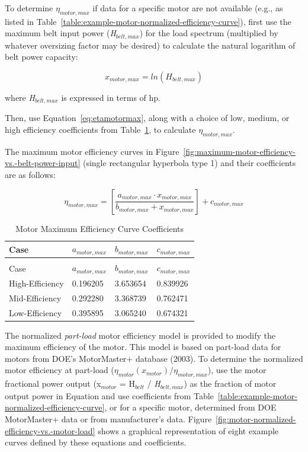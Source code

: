 {{{To determine \(\eta_{motor,max}\) if data for a specific motor are not available (e.g., as listed in Table~\ref{table:example-motor-normalized-efficiency-curve}), first use the maximum belt input power (\emph{H\(_{belt,max}\)}) for the load spectrum (multiplied by whatever oversizing factor may be desired) to calculate the natural logarithm of belt power capacity:

\begin{equation}
x_{motor,max} = ln({H_{belt,max}})
\end{equation}

where \emph{H\(_{belt,max}\)} is expressed in terms of hp.

Then, use Equation~\ref{eq:etamotormax}, along with a choice of low, medium, or high efficiency coefficients from Table~\ref{table:motor-maximum-efficiency-curve-coefficients}, to calculate \(\eta_{motor,max}\).

The maximum motor efficiency curves in Figure~\ref{fig:maximum-motor-efficiency-vs.-belt-power-input} (single rectangular hyperbola type 1) and their coefficients are as follows:

\begin{equation}
{\eta_{motor,max}} = \left[ {\frac{{{a_{motor,max}} \cdot {x_{motor,max}}}}{{{b_{motor,max}} + {x_{motor,max}}}}} \right] + {c_{motor,max}}
\label{eq:etamotormax}
\end{equation}

\begin{longtable}[c]{@{}llll@{}}
\caption{Motor Maximum Efficiency Curve Coefficients \label{table:motor-maximum-efficiency-curve-coefficients}} \tabularnewline
\toprule 
Case & \(a_{motor,max}\) & \(b_{motor,max}\) & \(c_{motor,max}\) \tabularnewline
\midrule
\endfirsthead

\caption[]{Motor Maximum Efficiency Curve Coefficients} \tabularnewline
\toprule 
Case & \(a_{motor,max}\) & \(b_{motor,max}\) & \(c_{motor,max}\) \tabularnewline
\midrule
\endhead

High-Efficiency & 0.196205 & 3.653654 & 0.839926 \tabularnewline
Mid-Efficiency & 0.292280 & 3.368739 & 0.762471 \tabularnewline
Low-Efficiency & 0.395895 & 3.065240 & 0.674321 \tabularnewline
\bottomrule
\end{longtable}

The normalized \emph{part-load} motor efficiency model is provided to modify the maximum efficiency of the motor. This model is based on part-load data for motors from DOE's MotorMaster+ database (2003). To determine the normalized motor efficiency at part-load (\(\eta_{motor}(x_{motor}) / \eta_{motor,max}\)), use the motor fractional power output (x\(_{motor}\) = H\(_{belt}\) / \emph{H\(_{belt,max}\)}) as the fraction of motor output power in Equation and use coefficients from Table~\ref{table:example-motor-normalized-efficiency-curve}, or for a specific motor, determined from DOE MotorMaster+ data or from manufacturer's data. Figure~\ref{fig:motor-normalized-efficiency-vs.-motor-load} shows a graphical representation of eight example curves defined by these equations and coefficients.

}}}
